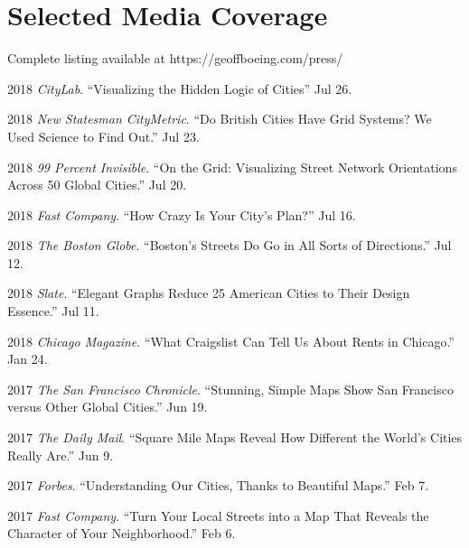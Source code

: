 \documentclass[12pt,letterpaper]{report}
\begin{document}
	
	
	\section*{Selected Media Coverage}
	
	Complete listing available at https://geoffboeing.com/press/ \bigskip
	
	\begin{tablist}
		
		\item 2018 \tab \textit{CityLab}. \enquote{Visualizing the Hidden Logic of Cities} Jul 26.
		
		\item 2018 \tab \textit{New Statesman CityMetric}. \enquote{Do British Cities Have Grid Systems? We Used Science to Find Out.} Jul 23.
		
		\item 2018 \tab \textit{99 Percent Invisible}. \enquote{On the Grid: Visualizing Street Network Orientations Across 50 Global Cities.} Jul 20.
		
		\item 2018 \tab \textit{Fast Company}. \enquote{How Crazy Is Your City's Plan?} Jul 16.
		
		\item 2018 \tab \textit{The Boston Globe}. \enquote{Boston's Streets Do Go in All Sorts of Directions.} Jul 12.
		
		\item 2018 \tab \textit{Slate}. \enquote{Elegant Graphs Reduce 25 American Cities to Their Design Essence.} Jul 11.	
		
		\item 2018 \tab \textit{Chicago Magazine}. \enquote{What Craigslist Can Tell Us About Rents in Chicago.} Jan 24.
		
		\item 2017 \tab \textit{The San Francisco Chronicle}. \enquote{Stunning, Simple Maps Show San Francisco versus Other Global Cities.} Jun 19.
		
		\item 2017 \tab \textit{The Daily Mail}. \enquote{Square Mile Maps Reveal How Different the World's Cities Really Are.} Jun 9.
		
		\item 2017 \tab \textit{Forbes}. \enquote{Understanding Our Cities, Thanks to Beautiful Maps.} Feb 7.
		
		\item 2017 \tab \textit{Fast Company}. \enquote{Turn Your Local Streets into a Map That Reveals the Character of Your Neighborhood.} Feb 6.
		

\end{tablist}
\end{document}
